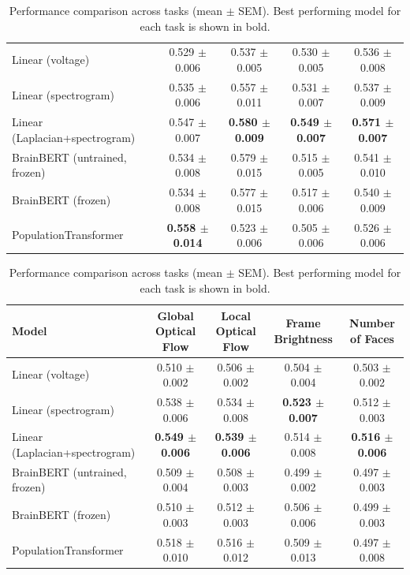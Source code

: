 \begin{table}[h]
\begin{tabular}{lcccc}
\hline
Linear (voltage) & 0.529 $\pm$ 0.006 & 0.537 $\pm$ 0.005 & 0.530 $\pm$ 0.005 & 0.536 $\pm$ 0.008 \\
Linear (spectrogram) & 0.535 $\pm$ 0.006 & 0.557 $\pm$ 0.011 & 0.531 $\pm$ 0.007 & 0.537 $\pm$ 0.009 \\
Linear (Laplacian+spectrogram) & 0.547 $\pm$ 0.007 & \textbf{0.580 $\pm$ 0.009} & \textbf{0.549 $\pm$ 0.007} & \textbf{0.571 $\pm$ 0.007} \\
BrainBERT (untrained, frozen) & 0.534 $\pm$ 0.008 & 0.579 $\pm$ 0.015 & 0.515 $\pm$ 0.005 & 0.541 $\pm$ 0.010 \\
BrainBERT (frozen) & 0.534 $\pm$ 0.008 & 0.577 $\pm$ 0.015 & 0.517 $\pm$ 0.006 & 0.540 $\pm$ 0.009 \\
PopulationTransformer & \textbf{0.558 $\pm$ 0.014} & 0.523 $\pm$ 0.006 & 0.505 $\pm$ 0.006 & 0.526 $\pm$ 0.006 \\
\hline
\end{tabular}
\hspace{1em}
\begin{tabular}{lcccc}
\hline
Model & Global Optical Flow & Local Optical Flow & Frame Brightness & Number of Faces \\
\hline
Linear (voltage) & 0.510 $\pm$ 0.002 & 0.506 $\pm$ 0.002 & 0.504 $\pm$ 0.004 & 0.503 $\pm$ 0.002 \\
Linear (spectrogram) & 0.538 $\pm$ 0.006 & 0.534 $\pm$ 0.008 & \textbf{0.523 $\pm$ 0.007} & 0.512 $\pm$ 0.003 \\
Linear (Laplacian+spectrogram) & \textbf{0.549 $\pm$ 0.006} & \textbf{0.539 $\pm$ 0.006} & 0.514 $\pm$ 0.008 & \textbf{0.516 $\pm$ 0.006} \\
BrainBERT (untrained, frozen) & 0.509 $\pm$ 0.004 & 0.508 $\pm$ 0.003 & 0.499 $\pm$ 0.002 & 0.497 $\pm$ 0.003 \\
BrainBERT (frozen) & 0.510 $\pm$ 0.003 & 0.512 $\pm$ 0.003 & 0.506 $\pm$ 0.006 & 0.499 $\pm$ 0.003 \\
PopulationTransformer & 0.518 $\pm$ 0.010 & 0.516 $\pm$ 0.012 & 0.509 $\pm$ 0.013 & 0.497 $\pm$ 0.008 \\
\hline
\end{tabular}
\caption{Performance comparison across tasks (mean $\pm$ SEM). Best performing model for each task is shown in bold.}
\label{tab:performance_comparison}
\end{table}